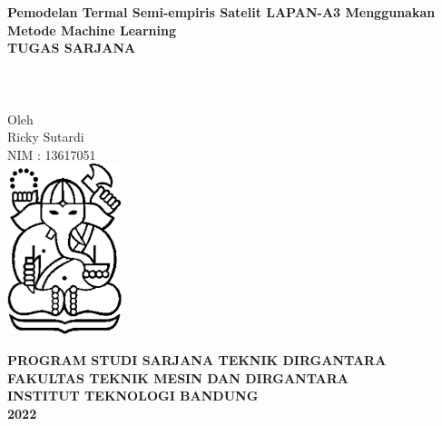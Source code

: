 \documentclass[12pt, oneside, a4paper]{report}
\begin{document}
\begin{titlepage}
    \begin{center}

        \textbf{\Large Pemodelan Termal Semi-empiris Satelit LAPAN-A3 Menggunakan Metode Machine Learning}\\
        \vspace{7em}
        \textbf{\large TUGAS SARJANA}\\
         \\
         \\
         \\
        
        \vspace{5em}
        Oleh\\
        Ricky Sutardi\\
        NIM : 13617051\\
       
       \vfill
       \includegraphics[width=0.25\textwidth]{fig/logo_itb.png}
    
       \vfill
        
       \textbf{PROGRAM STUDI SARJANA TEKNIK DIRGANTARA}\\
       \textbf{FAKULTAS TEKNIK MESIN DAN DIRGANTARA}\\
       \large
       \textbf{INSTITUT TEKNOLOGI BANDUNG}\\
       \textbf{2022}\\
       
   \end{center}
\end{titlepage}



\newpage
{}


\newpage
{}

\end{document}
